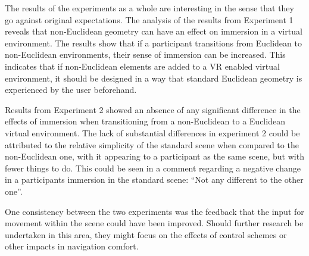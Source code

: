 		The results of the experiments as a whole are interesting in the sense that they go against original expectations.
		The analysis of the results from Experiment 1 reveals that non-Euclidean geometry can have an effect on immersion in a virtual environment.
		The results show that if a participant transitions from Euclidean to non-Euclidean environments, their sense of immersion can be increased.
		This indicates that if non-Euclidean elements are added to a VR enabled virtual environment, it should be designed in a way that standard Euclidean geometry is experienced by the user beforehand.

		Results from Experiment 2 showed an absence of any significant difference in the effects of immersion when transitioning from a non-Euclidean to a Euclidean virtual environment.
		The lack of substantial differences in experiment 2 could be attributed to the relative simplicity of the standard scene when compared to the non-Euclidean one, with it appearing to a participant as the same scene, but with fewer things to do.
		This could be seen in a comment regarding a negative change in a participants immersion in the standard scene: \enquote{Not any different to the other one}.

		One consistency between the two experiments was the feedback that the input for movement within the scene could have been improved.
		Should further research be undertaken in this area, they might focus on the effects of control schemes or other impacts in navigation comfort.
